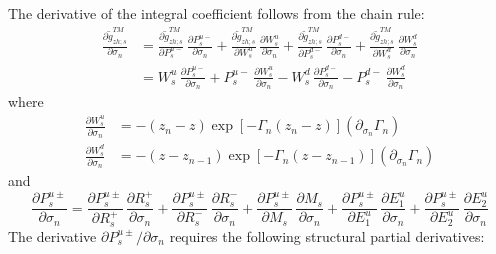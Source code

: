 \documentclass[12pt]{report}
\newcommand{\pds}[1]{\partial_{\sigma_{#1}}}   %
\begin{document}
The derivative of the integral coefficient follows from the chain rule:
\begin{align}
    \frac{\partial \tilde{g}^{TM}_{zh;s}}{\partial \sigma_n}
    &= \frac{\partial \tilde{g}^{TM}_{zh;s}}{\partial P_s^{u-}}\,
       \frac{\partial P_s^{u-}}{\partial \sigma_n}
     + \frac{\partial \tilde{g}^{TM}_{zh;s}}{\partial W_s^u}\,
       \frac{\partial W_s^u}{\partial \sigma_n}
     + \frac{\partial \tilde{g}^{TM}_{zh;s}}{\partial P_s^{d-}}\,
       \frac{\partial P_s^{d-}}{\partial \sigma_n}
     + \frac{\partial \tilde{g}^{TM}_{zh;s}}{\partial W_s^d}\,
       \frac{\partial W_s^d}{\partial \sigma_n}
    \label{eq:1.47} \\
    &= W_s^u\,\frac{\partial P_s^{u-}}{\partial \sigma_n}
     + P_s^{u-}\,\frac{\partial W_s^u}{\partial \sigma_n}
     - W_s^d\,\frac{\partial P_s^{d-}}{\partial \sigma_n}
     - P_s^{d-}\,\frac{\partial W_s^d}{\partial \sigma_n}
    \label{eq:1.48}
\end{align}
where
\begin{align}
    \frac{\partial W_s^u}{\partial \sigma_n}
    &= -(z_n - z)\exp\!\left[-\Gamma_n(z_n-z)\right](\pds{n}\Gamma_n)
    \label{eq:1.49} \\
    \frac{\partial W_s^d}{\partial \sigma_n}
    &= -(z - z_{n-1})\exp\!\left[-\Gamma_n(z-z_{n-1})\right](\pds{n}\Gamma_n)
    \label{eq:1.50}
\end{align}
and
\begin{equation}
    \frac{\partial P_s^{u\pm}}{\partial \sigma_n}
    = \frac{\partial P_s^{u\pm}}{\partial R_s^+}\,\frac{\partial R_s^+}{\partial \sigma_n}
    + \frac{\partial P_s^{u\pm}}{\partial R_s^-}\,\frac{\partial R_s^-}{\partial \sigma_n}
    + \frac{\partial P_s^{u\pm}}{\partial M_s}\,\frac{\partial M_s}{\partial \sigma_n}
    + \frac{\partial P_s^{u\pm}}{\partial E_1^u}\,\frac{\partial E_1^u}{\partial \sigma_n}
    + \frac{\partial P_s^{u\pm}}{\partial E_2^u}\,\frac{\partial E_2^u}{\partial \sigma_n}
    \label{eq:1.51}
\end{equation}
The derivative \(\partial P_s^{u\pm}/\partial\sigma_n\) requires the
following structural partial derivatives:
\end{document}
